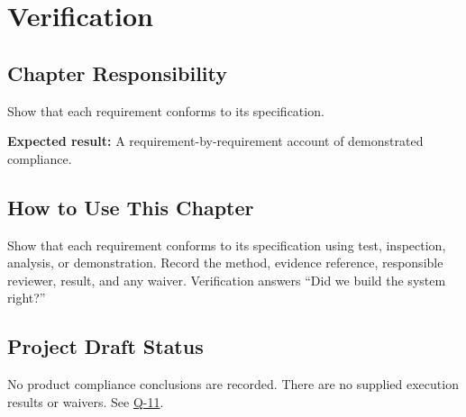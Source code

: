 \chapter{Verification}
\section{Chapter Responsibility}
\label{Section:VerificationResponsibility}
Show that each requirement conforms to its specification.

\noindent\textbf{Expected result:} A requirement-by-requirement account of demonstrated compliance.

\section{How to Use This Chapter}
Show that each requirement conforms to its specification using test, inspection, analysis, or demonstration. Record the method, evidence reference, responsible reviewer, result, and any waiver.
Verification answers ``Did we build the system right?''

\section{Project Draft Status}
No product compliance conclusions are recorded. There are no supplied execution results or waivers. See \hyperref[Question:Q-11]{Q-11}.
